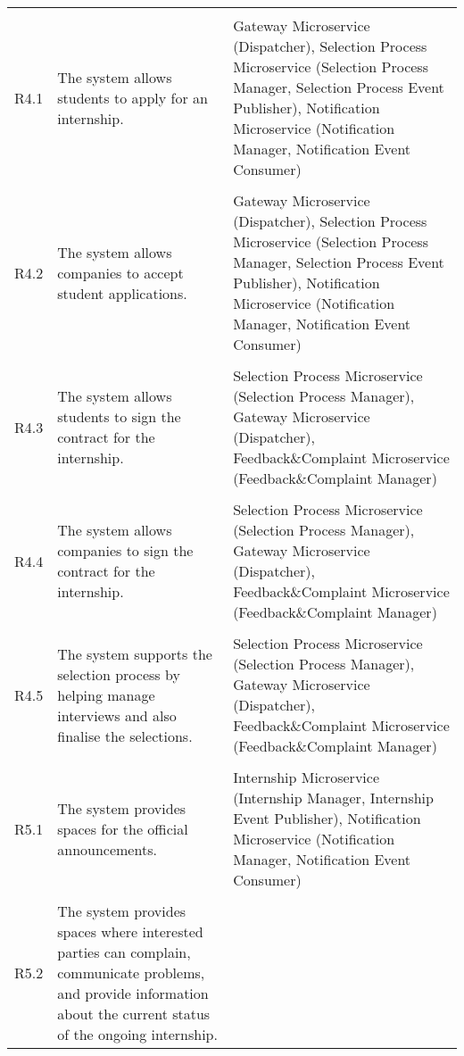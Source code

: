 \begin{longtable}{p{}p{}p{}}
    \vspace{0.5em}\\
    R4.1 &
    The system allows students to apply for an internship. &
    Gateway Microservice (Dispatcher), Selection Process Microservice (Selection Process Manager, Selection Process Event Publisher), Notification Microservice (Notification Manager, Notification Event Consumer) \\
    \vspace{0.5em}\\
    R4.2 &
    The system allows companies to accept student applications. &
    Gateway Microservice (Dispatcher), Selection Process Microservice (Selection Process Manager, Selection Process Event Publisher), Notification Microservice (Notification Manager, Notification Event Consumer) \\
    \vspace{0.5em}\\
    R4.3 &
    The system allows students to sign the contract for the internship. &
    Selection Process Microservice (Selection Process Manager), Gateway Microservice (Dispatcher), Feedback\&Complaint Microservice (Feedback\&Complaint Manager) \\
    \vspace{0.5em}\\
    R4.4 &
    The system allows companies to sign the contract for the internship. &
    Selection Process Microservice (Selection Process Manager), Gateway Microservice (Dispatcher), Feedback\&Complaint Microservice (Feedback\&Complaint Manager) \\
    \vspace{0.5em}\\
    R4.5 &
    The system supports the selection process by helping manage interviews and also finalise the selections. &
    Selection Process Microservice (Selection Process Manager), Gateway Microservice (Dispatcher), Feedback\&Complaint Microservice (Feedback\&Complaint Manager) \\
    \vspace{0.5em}\\
    R5.1 &
    The system provides spaces for the official announcements. &
    Internship Microservice (Internship Manager, Internship Event Publisher), Notification Microservice (Notification Manager, Notification Event Consumer) \\
    \vspace{0.5em}\\
    R5.2 &
    The system provides spaces where interested parties can complain, communicate problems, and provide information about the current status of the ongoing internship. &

\end{longtable}
